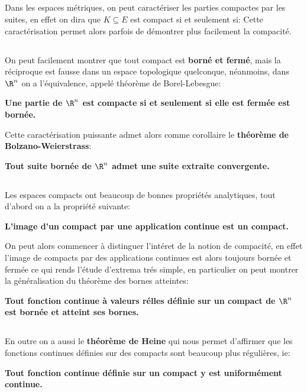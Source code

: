 \subsection*{}
Dans les espaces métriques, on peut caractériser les parties compactes par les suites, en effet on dira que \(K \subseteq E\) est compact si et seulement si:
Cette caractérisation permet alors parfois de démontrer plus facilement la compacité.
\subsection*{}
On peut facilement montrer que tout compact est \textbf{borné et fermé}, mais la réciproque est fausse dans un espace topologique quelconque, néanmoins, dans \(\R^n\) on a l'équivalence, appelé théorème de Borel-Lebesgue:
\begin{center}
   \textbf{Une partie de \(\R^n\) est compacte si et seulement si elle est fermée est bornée.}
\end{center}
Cette caractérisation puissante admet alors comme corollaire le \textbf{théorème de Bolzano-Weierstrass}:
\begin{center}
   \textbf{Tout suite bornée de \(\R^n\) admet une suite extraite convergente.}
\end{center}
\subsection*{}
Les espaces compacts ont beaucoup de bonnes propriétés analytiques, tout d'abord on a la propriété suivante:
\begin{center}
   \textbf{L'image d'un compact par une application continue est un compact.}
\end{center}
On peut alors commencer à distinguer l'intéret de la notion de compacité, en effet l'image de compacts par des applications continues est alors toujours bornée et fermée ce qui rends l'étude d'extrema trés simple, en particulier on peut montrer la généralisation du théorème des bornes atteintes:
\begin{center}
   \textbf{Tout fonction continue à valeurs rélles définie sur un compact de \(\R^n\) est bornée et atteint ses bornes.}
\end{center}
\subsection*{}
En outre on a aussi le \textbf{théorème de Heine} qui nous permet d'affirmer que les fonctions continues définies sur des compacts sont beaucoup plus régulières, ie:
\begin{center}
   \textbf{Tout fonction continue définie sur un compact y est uniformément continue.}

\end{center}


